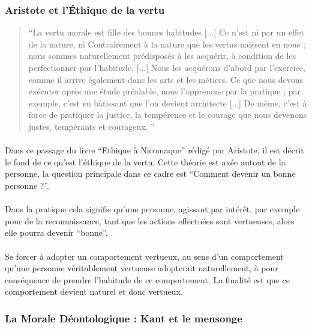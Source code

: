 \documentclass[10pt, french, a4paper]{report}
\begin{document}
\subsubsection{Aristote et l'\uppercase{é}thique de la vertu}

\begin{quotation}
  ``La vertu morale est fille des bonnes habitudes [...] Ce n'est ni par un effet de la nature, ni Contrairement à la nature que les vertus naissent en nous ; nous sommes naturellement prédisposés à les acquérir, à condition de les perfectionner par l'habitude. [...] Nous les acquérons d'abord par l'exercice, comme il arrive également dans les arts et les métiers. Ce que nous devons exécuter après une étude préalable, nous l'apprenons par la pratique ; par exemple, c'est en bâtissant que l'on devient architecte [...] De même, c'est à force de pratiquer la justice, la tempérence et le courage que nous devenons justes, tempérants et courageux. ''
\end{quotation}

\paragraph{}
Dans ce passage du livre ``Ethique à Nicomaque'' rédigé par Aristote, il est décrit le fond de ce qu'est l'éthique de la vertu. Cette théorie est axée autout de la personne, la question principale dans ce cadre est ``Comment devenir un bonne personne ?''.

\paragraph{}
Dans la pratique cela signifie qu'une personne, agissant par intérêt, par exemple pour de la reconnaissance, tant que les actions effectuées sont vertueuses, alors elle pourra devenir ``bonne''. 

\paragraph{}
Se forcer à adopter un comportement vertueux, au sens d'un comportement qu'une personne véritablement vertueuse adopterait naturellement, à pour conséquence de prendre l'habitude de ce comportement. La finalité est que ce comportement devient naturel et donc vertueux.

\subsubsection{La Morale Déontologique : Kant et le mensonge}
\end{document}
